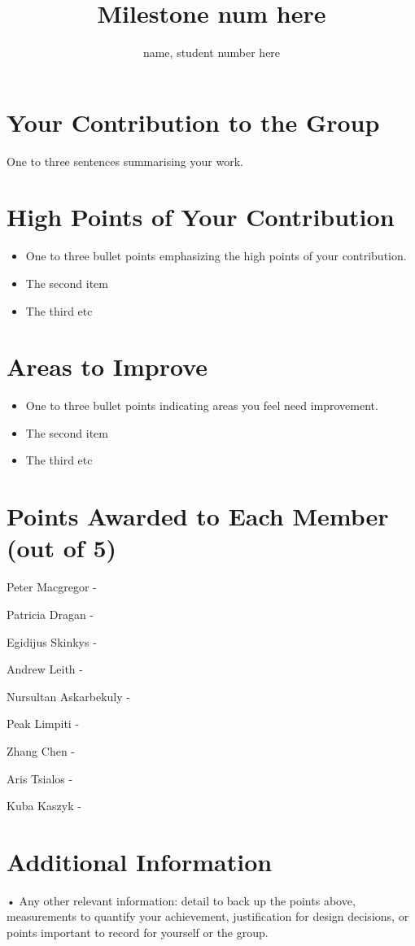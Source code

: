 \documentclass[dvips]{article}
\begin{document}
\sloppy
\title{Milestone num here}
 
\author{name, student number here}
 
\maketitle

\section{Your Contribution to the Group}
One to three sentences summarising your work. 

\section{High Points of Your Contribution}
\begin{itemize}
  \item One to three bullet points emphasizing the high points of your contribution.
  \item The second item
  \item The third etc
\end{itemize} 

\section{Areas to Improve}
\begin{itemize}
  \item One to three bullet points indicating areas you feel need improvement.
  \item The second item
  \item The third etc
\end{itemize}


\section{Points Awarded to Each Member (out of 5)}
\begin{itemize}
\begin{multicols}{2}
\item Peter Macgregor - 
\item Patricia Dragan - 
\item Egidijus Skinkys - 
\item Andrew Leith - 
\item Nursultan Askarbekuly - 
\item Peak Limpiti - 
\item Zhang Chen - 
\item Aris Tsialos - 
\item Kuba Kaszyk - 
\end{multicols}
\end{itemize}

\section{Additional Information}
• Any other relevant information: detail to back up the points above, measurements
to quantify your achievement, justiﬁcation for design decisions, or points important
to record for yourself or the group.
\end{document}
